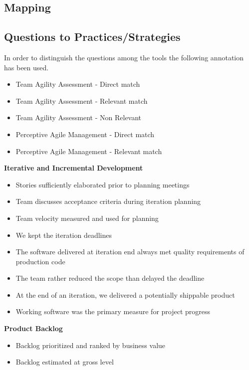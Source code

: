 \begin{appendices}
\chapter{Mapping}
\label{sec:mapping}


\section{Questions to Practices/Strategies}

\newcommand*\taa{\item[\FiveStar]}
\newcommand*\taar{\item[\FiveStarShadow]}
\newcommand*\taanr{\item[\SnowflakeChevron]}
\newcommand*\pam{\item[\AsteriskBold]}
\newcommand*\pamr{\item[\AsteriskThinCenterOpen]}

In order to distinguish the questions among the tools the following annotation has been used. 
\begin{itemize}
  \taa Team Agility Assessment - Direct match
  \taar Team Agility Assessment - Relevant match
  \taanr Team Agility Assessment - Non Relevant
  \pam Perceptive Agile Management - Direct match
  \pamr Perceptive Agile Management - Relevant match
\end{itemize}

\vspace{0.5cm}

\textbf{Iterative and Incremental Development}
\begin{itemize}
	\taa Stories sufficiently elaborated prior to planning meetings
	\taar Team discusses acceptance criteria during iteration planning
	\taar Team velocity measured and used for planning
	\pam We kept the iteration deadlines
	\pamr The software delivered at iteration end always met quality requirements of production code
	\pamr The team rather reduced the scope than delayed the deadline
	\pamr At the end of an iteration, we delivered a potentially shippable product
	\pamr Working software was the primary measure for project progress
\end{itemize}

\textbf{Product Backlog}
\begin{itemize}
	\taa Backlog prioritized and ranked by business value
	\taar Backlog estimated at gross level %
\end{itemize}


\end{appendices}
